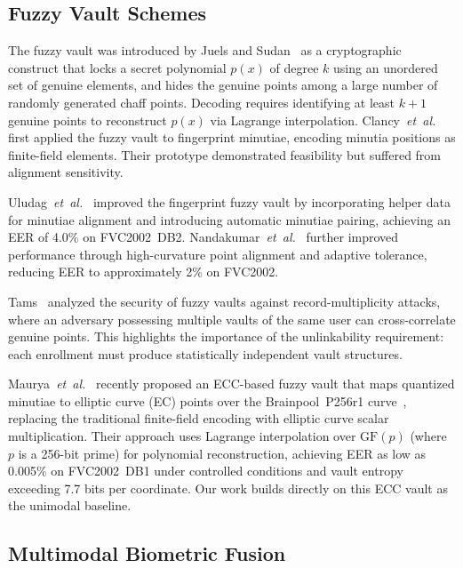\documentclass[conference]{IEEEtran}
\newcommand{\GFp}{\mathrm{GF}(p)}
\begin{document}
\subsection{Fuzzy Vault Schemes}

The fuzzy vault was introduced by Juels and Sudan~\cite{juels2002fuzzy} as a cryptographic construct that locks a secret polynomial $p(x)$ of degree $k$ using an unordered set of genuine elements, and hides the genuine points among a large number of randomly generated chaff points. Decoding requires identifying at least $k+1$ genuine points to reconstruct $p(x)$ via Lagrange interpolation. Clancy~\textit{et~al.}~\cite{clancy2003secure} first applied the fuzzy vault to fingerprint minutiae, encoding minutia positions as finite-field elements. Their prototype demonstrated feasibility but suffered from alignment sensitivity.

Uludag~\textit{et~al.}~\cite{uludag2005fuzzy} improved the fingerprint fuzzy vault by incorporating helper data for minutiae alignment and introducing automatic minutiae pairing, achieving an EER of 4.0\% on FVC2002~DB2. Nandakumar~\textit{et~al.}~\cite{nandakumar2007fuzzy} further improved performance through high-curvature point alignment and adaptive tolerance, reducing EER to approximately 2\% on FVC2002.

Tams~\cite{tams2013attacks} analyzed the security of fuzzy vaults against record-multiplicity attacks, where an adversary possessing multiple vaults of the same user can cross-correlate genuine points. This highlights the importance of the unlinkability requirement: each enrollment must produce statistically independent vault structures.

Maurya~\textit{et~al.}~\cite{maurya2025enhancing} recently proposed an ECC-based fuzzy vault that maps quantized minutiae to elliptic curve (EC) points over the Brainpool~P256r1 curve~\cite{rfc5639}, replacing the traditional finite-field encoding with elliptic curve scalar multiplication. Their approach uses Lagrange interpolation over $\GFp{}$ (where $p$ is a 256-bit prime) for polynomial reconstruction, achieving EER as low as 0.005\% on FVC2002~DB1 under controlled conditions and vault entropy exceeding 7.7 bits per coordinate. Our work builds directly on this ECC vault as the unimodal baseline.

\subsection{Multimodal Biometric Fusion}
\end{document}
